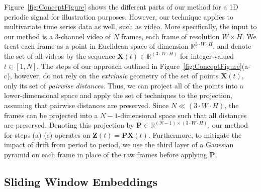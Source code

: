 \documentclass{article}
\newcommand{\mb}{\mathbf}
\begin{document}
Figure~\ref{fig:ConceptFigure} shows the different parts of our method for a 1D periodic signal for illustration purposes. However, our technique applies to multivariate time series data as well, such as video. More specifically, the input to our method is a 3-channel video of $N$ frames, each frame of resolution $W \times H$. We treat each frame as a point in Euclidean space of dimension $\mathbb{R}^{3 \cdot W \cdot H}$, and denote the set of all videos by the sequence $\mb{X}(t) \in \mathbb{R}^{(3 \cdot W \cdot H)}$ for integer-valued $t \in [1,N]$. The steps of our approach outlined in Figure~\ref{fig:ConceptFigure}(a-c), however, do not rely on the {\em extrinsic} geometry of the set of points $\mb{X}(t)$, only its set of {\em pairwise distances}. Thus, we can project all of the points into a lower-dimensional space and apply the set of techniques to the projection, assuming that pairwise distances are preserved. Since $N \ll (3 \cdot W \cdot H)$, the frames can be projected into a $N-1$-dimensional space such that all distances are preserved. Denoting this projection by $\mb{P} \in \mathbb{R}^{(N-1) \times (3 \cdot W \cdot H)}$, our method for steps (a)-(c) operates on $\mb{Z}(t) = \mb{P} \mb{X}(t)$.  Furthermore, to mitigate the impact of drift from period to period, we use the third layer of a Gaussian pyramid on each frame in place of the raw frames before applying $\mb{P}$.


\subsection{Sliding Window Embeddings}
\label{sec:slidingwindow}
\end{document}
